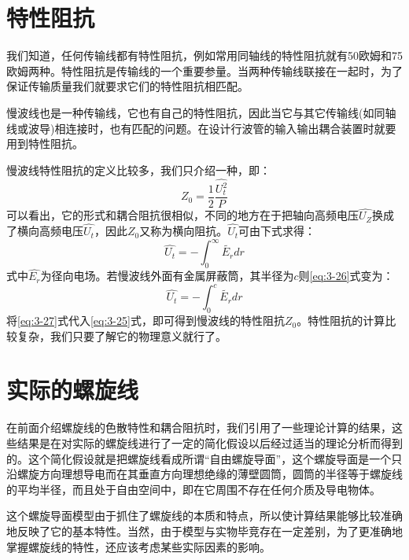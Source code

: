 \section{特性阻抗}

我们知道，任何传输线都有特性阻抗，例如常用同轴线的特性阻抗就有50欧姆和75欧姆两种。特性阻抗是传输线的一个重要参量。当两种传输线联接在一起时，为了保证传输质量我们就要求它们的特性阻抗相匹配。

慢波线也是一种传输线，它也有自己的特性阻抗，因此当它与其它传输线(如同轴线或波导)相连接时，也有匹配的问题。在设计行波管的输入输出耦合装置时就要用到特性阻抗。

慢波线特性阻抗的定义比较多，我们只介绍一种，即：
\begin{equation} \label{eq:3-25}
	Z_0 = \frac{1}{2}\frac{\hat{U_t^2}}{P}
\end{equation}
可以看出，它的形式和耦合阻抗很相似，不同的地方在于把轴向高频电压$ \hat{U_Z} $换成了横向高频电压$ \hat{U_t} $，因此$ Z_0 $又称为横向阻抗。$ \hat{U_t} $可由下式求得：
\begin{equation} \label{eq:3-26}
	\hat{U_t} = - \int_{0}^{\infty} \tilde{E_r}dr
\end{equation}
式中$ \hat{E_r} $为径向电场。若慢波线外面有金属屏蔽筒，其半径为$ c $则\eqref{eq:3-26}式变为：
\begin{equation} \label{eq:3-27}
	\hat{U_t} = -\int_{0}^{c}\tilde{E_r}dr
\end{equation}
将\eqref{eq:3-27}式代入\eqref{eq:3-25}式，即可得到慢波线的特性阻抗$ Z_0 $。特性阻抗的计算比较复杂，我们只要了解它的物理意义就行了。 

\section{实际的螺旋线}
在前面介绍螺旋线的色散特性和耦合阻抗时，我们引用了一些理论计算的结果，这些结果是在对实际的螺旋线进行了一定的简化假设以后经过适当的理论分析而得到的。这个简化假设就是把螺旋线看成所谓“自由螺旋导面”，这个螺旋导面是一个只沿螺旋方向理想导电而在其垂直方向理想绝缘的薄壁圆筒，圆筒的半径等于螺旋线的平均半径，而且处于自由空间中，即在它周围不存在任何介质及导电物体。

这个螺旋导面模型由于抓住了螺旋线的本质和特点，所以使计算结果能够比较准确地反映了它的基本特性。当然，由于模型与实物毕竞存在一定差别，为了更准确地掌握螺旋线的特性，还应该考虑某些实际因素的影响。

